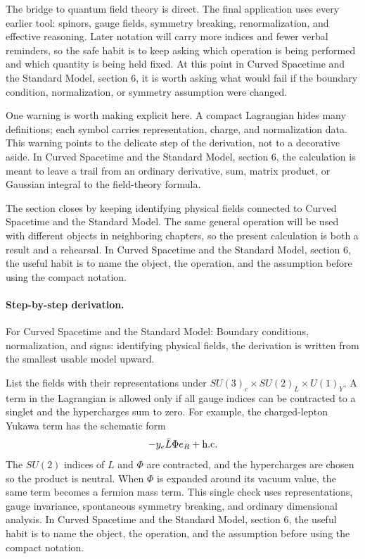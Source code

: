 The bridge to quantum field theory is direct.  The final application uses every earlier tool: spinors, gauge fields, symmetry breaking, renormalization, and effective reasoning.  Later notation will carry more indices and fewer verbal reminders, so the safe habit is to keep asking which operation is being performed and which quantity is being held fixed.  At this point in Curved Spacetime and the Standard Model, section 6, it is worth asking what would fail if the boundary condition, normalization, or symmetry assumption were changed.

One warning is worth making explicit here.  A compact Lagrangian hides many definitions; each symbol carries representation, charge, and normalization data.  This warning points to the delicate step of the derivation, not to a decorative aside.  In Curved Spacetime and the Standard Model, section 6, the calculation is meant to leave a trail from an ordinary derivative, sum, matrix product, or Gaussian integral to the field-theory formula.

The section closes by keeping identifying physical fields connected to Curved Spacetime and the Standard Model.  The same general operation will be used with different objects in neighboring chapters, so the present calculation is both a result and a rehearsal.  In Curved Spacetime and the Standard Model, section 6, the useful habit is to name the object, the operation, and the assumption before using the compact notation.



\paragraph{Step-by-step derivation.}

For Curved Spacetime and the Standard Model: Boundary conditions, normalization, and signs: identifying physical fields, the derivation is written from the smallest usable model upward.

List the fields with their representations under \(SU(3)_c\times SU(2)_L\times U(1)_Y\).  A term in the Lagrangian is allowed only if all gauge indices can be contracted to a singlet and the hypercharges sum to zero.  For example, the charged-lepton Yukawa term has the schematic form
\[
  -y_e\bar L\Phi e_R+\hbox{h.c.}
\]
The \(SU(2)\) indices of \(L\) and \(\Phi\) are contracted, and the hypercharges are chosen so the product is neutral.  When \(\Phi\) is expanded around its vacuum value, the same term becomes a fermion mass term.  This single check uses representations, gauge invariance, spontaneous symmetry breaking, and ordinary dimensional analysis.  In Curved Spacetime and the Standard Model, section 6, the useful habit is to name the object, the operation, and the assumption before using the compact notation.

